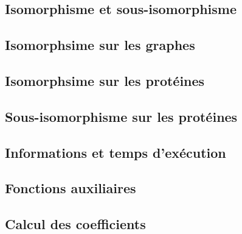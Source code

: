 \begin{frame}   
    \section{Isomorphisme et sous-isomorphisme}
    \subsection{Isomorphsime sur les graphes}
    
    \subsection{Isomorphsime sur les protéines}
    
    \subsection{Sous-isomorphisme sur les protéines}
    
    \subsection{Informations et temps d'exécution}
    
    
\end{frame}
\begin{frame}
    \section{Fonctions auxiliaires}
    
\end{frame}
\begin{frame}
    \section{Calcul des coefficients}
    
    
\end{frame}
